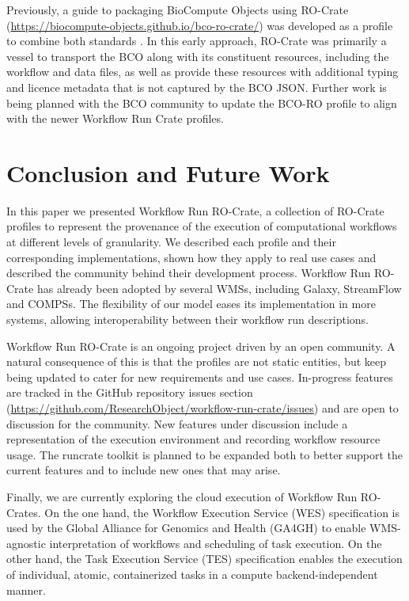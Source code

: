 \documentclass[10pt,letterpaper]{article}
\begin{document}
Previously, a guide to packaging BioCompute Objects using RO-Crate (\url{https://biocompute-objects.github.io/bco-ro-crate/}) was developed as a profile to combine both standards \cite{Soiland-Reyes 2021}.
In this early approach, RO-Crate was primarily a vessel to transport the BCO along with its constituent resources, including the workflow and data files, as well as provide these resources with additional typing and licence metadata that is not captured by the BCO JSON. 
Further work is being planned with the BCO community to update the BCO-RO profile to align with the newer Workflow Run Crate profiles. 

\hypertarget{conclusion}{%
\section{Conclusion and Future Work}\label{conclusion}}

In this paper we presented Workflow Run RO-Crate, a collection of RO-Crate profiles to represent the provenance of the execution of computational workflows at different levels of granularity.
We described each profile and their corresponding implementations, shown how they apply to real use cases and described the community behind their development process.
Workflow Run RO-Crate has already been adopted by several WMSs, including Galaxy, StreamFlow and COMPSs. The flexibility of our model eases its implementation in more systems, allowing interoperability between their workflow run descriptions.

Workflow Run RO-Crate is an ongoing project driven by an open community.
A natural consequence of this is that the profiles are not static entities, but keep being updated to cater for new requirements and use cases.
In-progress features are tracked in the GitHub repository issues section (\url{https://github.com/ResearchObject/workflow-run-crate/issues}) and are open to discussion for the community.
New features under discussion include a representation of the execution environment and recording workflow resource usage.
The runcrate toolkit is planned to be expanded both to better support the current features and to include new ones that may arise.

Finally, we are currently exploring the cloud execution of Workflow Run RO-Crates.
On the one hand, the Workflow Execution Service (WES) specification is used by the Global Alliance for Genomics and Health (GA4GH) \cite{Rehm 2021} to enable WMS-agnostic interpretation of workflows and scheduling of task execution. On the other hand, the Task Execution Service (TES) specification enables the execution of individual, atomic, containerized tasks in a compute backend-independent manner.
\end{document}
